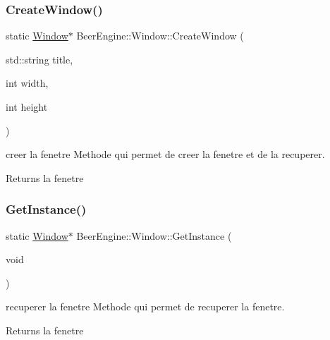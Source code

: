 \subsubsection{\texorpdfstring{Create\+Window()}{CreateWindow()}}
{\footnotesize\ttfamily static \mbox{\hyperlink{class_beer_engine_1_1_window}{Window}}$\ast$ Beer\+Engine\+::\+Window\+::\+Create\+Window (\begin{DoxyParamCaption}\item[{std\+::string}]{title,  }\item[{int}]{width,  }\item[{int}]{height }\end{DoxyParamCaption})\hspace{0.3cm}{\ttfamily [static]}}



creer la fenetre Methode qui permet de creer la fenetre et de la recuperer. 

\begin{DoxyReturn}{Returns}
la fenetre 
\end{DoxyReturn}
\mbox{\label{class_beer_engine_1_1_window_a9a73331ffd93866e83e766540e3891fb}} 
\subsubsection{\texorpdfstring{Get\+Instance()}{GetInstance()}}
{\footnotesize\ttfamily static \mbox{\hyperlink{class_beer_engine_1_1_window}{Window}}$\ast$ Beer\+Engine\+::\+Window\+::\+Get\+Instance (\begin{DoxyParamCaption}\item[{void}]{ }\end{DoxyParamCaption})\hspace{0.3cm}{\ttfamily [static]}}



recuperer la fenetre Methode qui permet de recuperer la fenetre. 

\begin{DoxyReturn}{Returns}
la fenetre 
\end{DoxyReturn}
\mbox{\label{class_beer_engine_1_1_window_a69da83af4143505f1e2c14649a854bd5}} 

